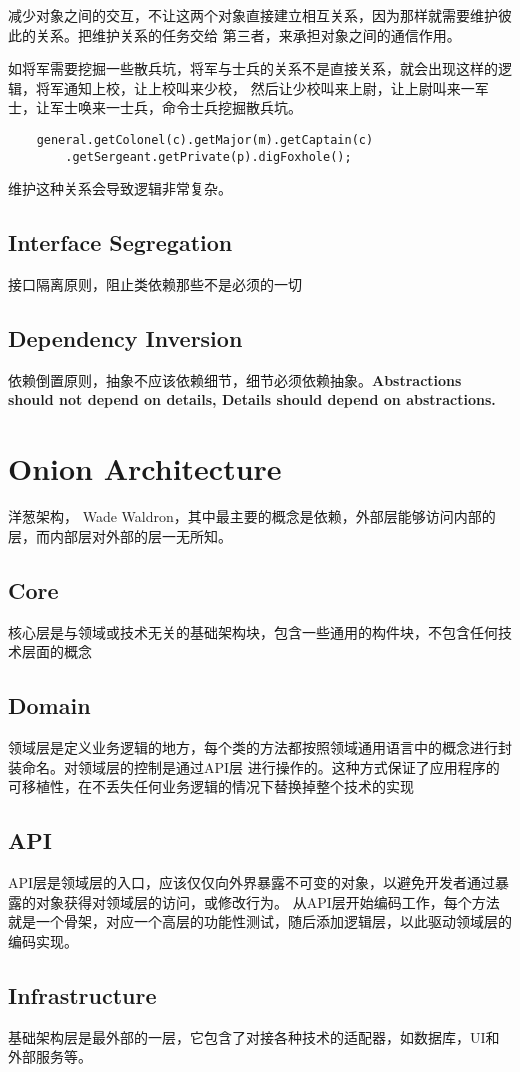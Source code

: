 减少对象之间的交互，不让这两个对象直接建立相互关系，因为那样就需要维护彼此的关系。把维护关系的任务交给
第三者，来承担对象之间的通信作用。

如将军需要挖掘一些散兵坑，将军与士兵的关系不是直接关系，就会出现这样的逻辑，将军通知上校，让上校叫来少校，
然后让少校叫来上尉，让上尉叫来一军士，让军士唤来一士兵，命令士兵挖掘散兵坑。
\begin{lstlisting}
    general.getColonel(c).getMajor(m).getCaptain(c)
        .getSergeant.getPrivate(p).digFoxhole();
\end{lstlisting}
维护这种关系会导致逻辑非常复杂。

\subsection{Interface Segregation}
接口隔离原则，阻止类依赖那些不是必须的一切

\subsection{Dependency Inversion}
依赖倒置原则，抽象不应该依赖细节，细节必须依赖抽象。\textbf{Abstractions should not depend on details,
Details should depend on abstractions.}

\section{Onion Architecture}

洋葱架构， Wade Waldron，其中最主要的概念是依赖，外部层能够访问内部的层，而内部层对外部的层一无所知。

\subsection{Core}
核心层是与领域或技术无关的基础架构块，包含一些通用的构件块，不包含任何技术层面的概念

\subsection{Domain}
领域层是定义业务逻辑的地方，每个类的方法都按照领域通用语言中的概念进行封装命名。对领域层的控制是通过API层
进行操作的。这种方式保证了应用程序的可移植性，在不丢失任何业务逻辑的情况下替换掉整个技术的实现

\subsection{API}
API层是领域层的入口，应该仅仅向外界暴露不可变的对象，以避免开发者通过暴露的对象获得对领域层的访问，或修改行为。
从API层开始编码工作，每个方法就是一个骨架，对应一个高层的功能性测试，随后添加逻辑层，以此驱动领域层的编码实现。

\subsection{Infrastructure}
基础架构层是最外部的一层，它包含了对接各种技术的适配器，如数据库，UI和外部服务等。
